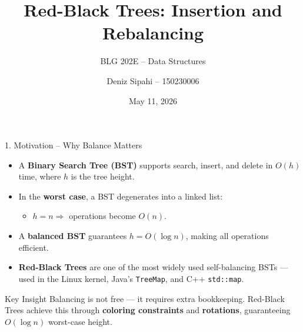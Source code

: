 \documentclass{beamer}
\title{Red-Black Trees: Insertion and Rebalancing}
\subtitle{BLG 202E -- Data Structures}
\author{Deniz Sipahi -- 150230006}
\date{May 11, 2026}
\institute{Istanbul Technical University}
\begin{document}
\begin{frame}
\titlepage
\end{frame}

\begin{frame}{1. Motivation -- Why Balance Matters}
\begin{itemize}
    \item A \textbf{Binary Search Tree (BST)} supports search, insert, and delete in $O(h)$ time, where $h$ is the tree height.
    \item In the \textbf{worst case}, a BST degenerates into a linked list:
    \begin{itemize}
        \item $h = n \Rightarrow$ operations become $O(n)$.
    \end{itemize}
    \item A \textbf{balanced BST} guarantees $h = O(\log n)$, making all operations efficient.
    \item \textbf{Red-Black Trees} are one of the most widely used self-balancing BSTs --- used in the Linux kernel, Java's \texttt{TreeMap}, and C++ \texttt{std::map}.
\end{itemize}

\begin{block}{Key Insight}
Balancing is not free --- it requires extra bookkeeping. Red-Black Trees achieve this through \textbf{coloring constraints} and \textbf{rotations}, guaranteeing $O(\log n)$ worst-case height.
\end{block}
\end{frame}
\end{document}
